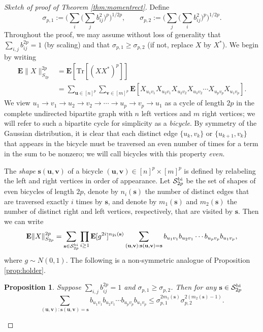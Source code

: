 \documentclass[10pt,reqno]{amsart}
\newtheorem{prop}[thm]{Proposition}
\theoremstyle{definition}
\numberwithin{equation}{section}
\numberwithin{figure}{section}
\numberwithin{table}{section}
\begin{document}
\begin{proof}[Sketch of proof of Theorem \ref{thm:momentrect}]
Define
$$
	\sigma_{p,1} :=
	\Bigg(\sum_i\Bigg(\sum_j 
	b_{ij}^2\Bigg)^p\Bigg)^{1/2p},\qquad
	\sigma_{p,2} :=
	\Bigg(\sum_j\Bigg(\sum_i
	b_{ij}^2\Bigg)^p\Bigg)^{1/2p}.
$$
Throughout the proof, we may assume without loss of generality that 
$\sum_{i,j}b_{ij}^{2p}=1$ (by scaling) and that 
$\sigma_{p,1}\ge\sigma_{p,2}$ (if not, replace $X$ by $X^*$).
We begin by writing
\begin{align*}
	\mathbf{E}\|X\|_{S_{2p}}^{2p} &=
	\mathbf{E}[\mathrm{Tr}[(XX^*)^p]]\\& =
	\sum_{\mathbf{u}\in[n]^p}\sum_{\mathbf{v}\in[m]^p}
	\mathbf{E}[X_{u_1v_1}X_{u_2v_1}X_{u_2v_2}X_{u_3v_2}\cdots
	X_{u_pv_p}X_{u_1v_p}].
\end{align*}
We view $u_1\to v_1\to u_2\to v_2\to \cdots\to u_p\to v_p\to u_1$ as a  
cycle of length $2p$ in the complete undirected bipartite graph with $n$ 
left vertices and $m$ right vertices; we will refer to such a bipartite 
cycle for simplicity as a \emph{bicycle}. By symmetry of the Gaussian 
distribution, it is clear that each distinct edge $\{u_k,v_k\}$ or 
$\{u_{k+1},v_k\}$ that appears in the bicycle must be traversed an even 
number of times for a term in the sum to be nonzero; we will call bicycles 
with this property \emph{even}.

The \emph{shape} $\mathbf{s}(\mathbf{u},\mathbf{v})$ of a bicycle 
$(\mathbf{u},\mathbf{v})\in[n]^p\times[m]^p$ is defined by relabeling the 
left and right vertices in order of appearance. Let $\mathcal{S}_{2p}^{\rm 
bi}$ be the set of shapes of even bicycles of length $2p$, denote by
$n_i(\mathbf{s})$ the number of distinct edges that are traversed exactly 
$i$ times by $\mathbf{s}$, and denote by $m_1(\mathbf{s})$ and 
$m_2(\mathbf{s})$ the number of distinct right and left 
vertices, respectively, that are visited by $\mathbf{s}$. Then we can 
write
$$
        \mathbf{E}\|X\|_{S_{2p}}^{2p} =
	\sum_{\mathbf{s}\in\mathcal{S}_{2p}^{\rm bi}} 
	\prod_{i\ge 1}\mathbf{E}[g^{2i}]^{n_{2i}(\mathbf{s})}
	\sum_{(\mathbf{u},\mathbf{v}):
	\mathbf{s}(\mathbf{u},\mathbf{v})=\mathbf{s}}
	b_{u_1v_1}b_{u_2v_1}\cdots b_{u_pv_p}b_{u_1v_p},
$$
where $g\sim N(0,1)$. The following is a non-symmetric analogue of
Proposition \ref{prop:holder}.

\begin{prop}
\label{prop:holderrect}
Suppose $\sum_{i,j}b_{ij}^{2p}=1$ and $\sigma_{p,1}\ge\sigma_{p,2}$. Then 
for any $\mathbf{s}\in\mathcal{S}_{2p}^{\rm bi}$
$$
	\sum_{(\mathbf{u},\mathbf{v}):
	\mathbf{s}(\mathbf{u},\mathbf{v})=\mathbf{s}}
	b_{u_1v_1}b_{u_2v_1}\cdots b_{u_pv_p}b_{u_1v_p}
	\le \sigma_{p,1}^{2m_1(\mathbf{s})}
	\sigma_{p,2}^{2(m_2(\mathbf{s})-1)}.
$$
\end{prop}


\end{proof}
\end{document}

